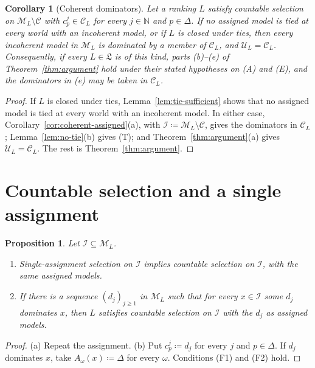 \documentclass[11pt]{article}
\newtheorem{proposition}[theorem]{Proposition}
\newtheorem{corollary}[theorem]{Corollary}
\theoremstyle{definition}
\theoremstyle{remark}
\newcommand{\M}{\mathcal M}
\newcommand{\C}{\mathcal C}
\newcommand{\I}{\mathcal I}
\newcommand{\U}{\mathcal U}
\newcommand{\Lf}{\mathfrak L}
\begin{document}
\begin{corollary}[Coherent dominators]\label{cor:coherent-dominators}
Let a ranking $L$ satisfy countable selection on $\M_L\setminus\C$ with {\color{red}$c^j_p\in\C_L$ for every $j\in\mathbb N$ and $p\in\Delta$}. If {\color{red}no assigned model is tied at every world with an incoherent model}, or if $L$ is closed under ties, then every incoherent model in $\M_L$ is dominated by a member of $\C_L$, and $\U_L=\C_L$. Consequently, if every $L\in\Lf$ is of this kind, parts (b)--(e) of Theorem~\ref{thm:argument} hold under their stated hypotheses on (A) and (E), and the dominators in (e) may be taken in $\C_L$.
\end{corollary}
\begin{proof}
{\color{red}If $L$ is closed under ties, Lemma~\ref{lem:tie-sufficient} shows that no assigned model is tied at every world with an incoherent model. In either case, Corollary~\ref{cor:coherent-assigned}(a), with $\I\coloneqq\M_L\setminus\C$, gives the dominators in $\C_L$; Lemma~\ref{lem:no-tie}(b) gives (T); and Theorem~\ref{thm:argument}(a) gives $\U_L=\C_L$.} The rest is Theorem~\ref{thm:argument}.
\end{proof}

\section{Countable selection and a single assignment}\label{sec:scope}

\begin{proposition}\label{prop:comparison}
Let $\I\subseteq\M_L$.
\begin{enumerate}[label=(\alph*)]
\item Single-assignment selection on $\I$ implies countable selection on $\I${\color{red}, with the same assigned models}.
\item If there is a sequence $(d_j)_{j\ge1}$ in $\M_L$ such that for every $x\in\I$ some $d_j$ dominates $x$, {\color{red}then $L$ satisfies countable selection on $\I$ with the $d_j$ as assigned models.}
\end{enumerate}
\end{proposition}
\begin{proof}
(a) Repeat the assignment. (b) {\color{red}Put $c^j_p\coloneqq d_j$ for every $j$ and $p\in\Delta$. If $d_j$ dominates $x$, take $A_\omega(x)\coloneqq\Delta$ for every $\omega$. Conditions (F1) and (F2) hold.}
\end{proof}
\end{document}
